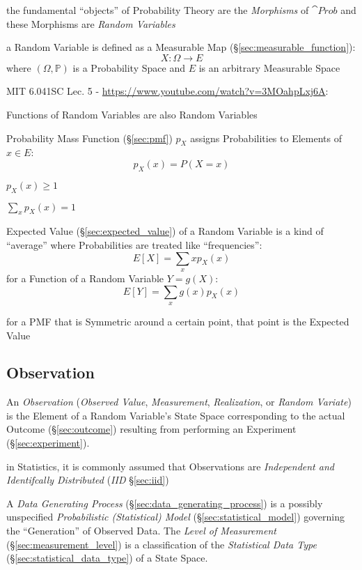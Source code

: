 the fundamental ``objects'' of Probability Theory are the \emph{Morphisms} of
$\cat{Prob}$ and these Morphisms are \emph{Random Variables}

a Random Variable is defined as a Measurable Map
(\S\ref{sec:measurable_function}):
\[
  X : \Omega \to E
\]
where $(\Omega,\mathbb{P})$ is a Probability Space and $E$ is an arbitrary
Measurable Space

\asterism

MIT 6.041SC Lec. 5 - \url{https://www.youtube.com/watch?v=3MOahpLxj6A}:

Functions of Random Variables are also Random Variables

Probability Mass Function (\S\ref{sec:pmf}) $p_X$ assigns
Probabilities to Elements of $x \in E$:
\[
  p_X(x) = P(X = x)
\]

$p_X(x) \geq 1$

$\sum_x p_X(x) = 1$

Expected Value (\S\ref{sec:expected_value}) of a Random Variable is a kind of
``average'' where Probabilities are treated like ``frequencies'':
\[
  E[X] = \sum_x xp_X(x)
\]
for a Function of a Random Variable $Y = g(X)$:
\[
  E[Y] = \sum_x g(x)p_X(x)
\]

for a PMF that is Symmetric around a certain point, that point is the Expected
Value



\subsection{Observation}\label{sec:observation}

An \emph{Observation} (\emph{Observed Value}, \emph{Measurement},
\emph{Realization}, or \emph{Random Variate}) is the Element of a Random
Variable's State Space corresponding to the actual Outcome (\S\ref{sec:outcome})
resulting from performing an Experiment (\S\ref{sec:experiment}).

in Statistics, it is commonly assumed that Observations are \emph{Independent
  and Identifcally Distributed} (\emph{IID} \S\ref{sec:iid})

\fist A \emph{Data Generating Process} (\S\ref{sec:data_generating_process})
is a possibly unspecified \emph{Probabilistic (Statistical) Model}
(\S\ref{sec:statistical_model}) governing the ``Generation'' of Observed Data.
The \emph{Level of Measurement} (\S\ref{sec:measurement_level}) is a
classification of the \emph{Statistical Data Type}
(\S\ref{sec:statistical_data_type}) of a State Space.


